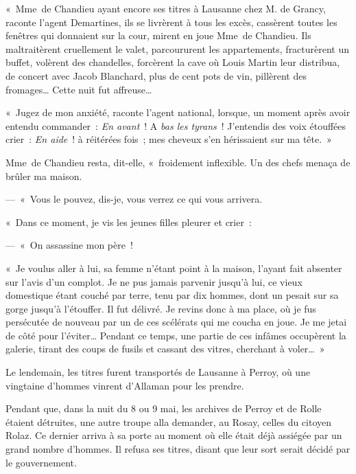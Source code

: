 \documentclass[french,twoside]{book} %
\newenvironment{quoteblock}%
  {\begin{quoting}}
  {\end{quoting}}
\newenvironment{quotebar}{%
    \def\FrameCommand{{\color{rubric!10!}\vrule width 0.5em} \hspace{0.9em}}%
    \def\OuterFrameSep{\itemsep} %
    \MakeFramed {\advance\hsize-\width \FrameRestore}
  }%
  {%
    \endMakeFramed
  }
\renewenvironment{quoteblock}%
  {%
    \savenotes
    \setstretch{0.9}
    \normalfont
    \begin{quotebar}
  }
  {%
    \end{quotebar}
    \spewnotes
  }
\begin{document}
\begin{quoteblock}
 \noindent « Mme de Chandieu ayant encore ses titres à Lausanne chez M. de Grancy, raconte l’agent Demartines, ils se livrèrent à tous les excès, cassèrent toutes les fenêtres qui donnaient sur la cour, mirent en joue Mme de Chandieu. Ils maltraitèrent cruellement le valet, parcoururent les appartements, fracturèrent un buffet, volèrent des chandelles, forcèrent la cave où Louis Martin leur distribua, de concert avec Jacob Blanchard, plus de cent pots de vin, pillèrent des fromages… Cette nuit fut affreuse…\par
 « Jugez de mon anxiété, raconte l’agent national, lorsque, un moment après avoir entendu commander : \emph{En avant} ! A \emph{bas les tyrans} ! J’entendis des voix étouffées crier : \emph{En aide} ! à réitérées fois ; mes cheveux s’en hérissaient sur ma tête. »\par
 Mme de Chandieu resta, dit-elle, « froidement inflexible. Un des chefs menaça de brûler ma maison.\par
 — « Vous le pouvez, dis-je, vous verrez ce qui vous arrivera.\par
 « Dans ce moment, je vis les jeunes filles pleurer et crier :\par
 — « On assassine mon père !\par
 « Je voulus aller à lui, sa femme n’étant point à la maison, l’ayant fait absenter sur l’avis d’un complot. Je ne pus jamais parvenir jusqu’à lui, ce vieux domestique étant couché par terre, tenu par dix hommes, dont un pesait sur sa gorge jusqu’à l’étouffer. Il fut délivré. Je revins donc à ma place, où je fus persécutée de nouveau par un de ces scélérats qui me coucha en joue. Je me jetai de côté pour l’éviter… Pendant ce temps, une partie de ces infâmes occupèrent la galerie, tirant des coups de fusils et cassant des vitres, cherchant à voler… »
 \end{quoteblock}

\noindent Le lendemain, les titres furent transportés de Lausanne à Perroy, où une vingtaine d’hommes vinrent d’Allaman pour les prendre.\par
Pendant que, dans la nuit du 8 ou 9 mai, les archives de Perroy et de Rolle étaient détruites, une autre troupe alla demander, au Rosay, celles du citoyen Rolaz. Ce dernier arriva à sa porte au moment où elle était déjà assiégée par un grand nombre d’hommes. Il refusa ses titres, disant que leur sort serait décidé par le gouvernement.\par
\end{document}
